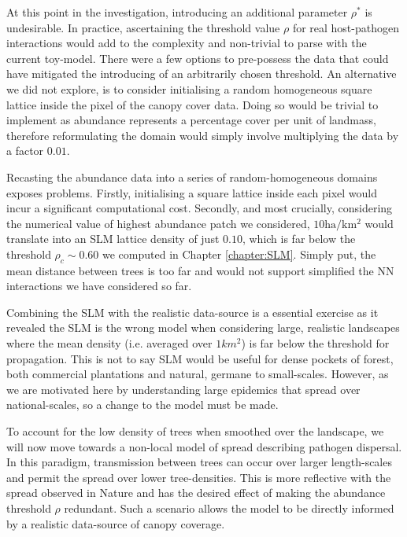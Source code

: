 At this point in the investigation, introducing an additional parameter $\rho^*$ is undesirable. %
In practice, ascertaining the threshold value $\rho$ for real host-pathogen interactions would add to the complexity and non-trivial to parse with the current toy-model. %
There were a few options to pre-possess the data that could have mitigated the introducing of an arbitrarily chosen threshold. %
An alternative we did not explore, is to consider initialising a random homogeneous square lattice inside the pixel of the canopy cover data. %
Doing so would be trivial to implement as abundance represents a percentage cover per unit of landmass, therefore reformulating the domain would simply involve multiplying the data by a factor $0.01$. %

Recasting the abundance data into a series of random-homogeneous domains exposes problems. %
Firstly, initialising a square lattice inside each pixel would incur a significant computational cost. %
Secondly, and most crucially, considering the numerical value of highest abundance patch we considered, $10\mathrm{ha/km^2}$ would translate into an SLM lattice density of just $0.10$, which  is far below the threshold $\rho_c \sim 0.60$ we computed in Chapter \ref{chapter:SLM}.%
Simply put, the mean distance between trees is too far and would not support simplified the NN interactions we have considered so far. 

Combining the SLM with the realistic data-source is a essential exercise as it revealed the SLM is the wrong model when considering large, realistic landscapes where the mean density (i.e. averaged over $1km^2$) is far below the threshold for propagation. %
This is not to say SLM would be useful for dense pockets of forest, both commercial plantations and natural, germane to small-scales. %
However, as we are motivated here by understanding large epidemics that spread over national-scales, so a change to the model must be made. 

To account for the low density of trees when smoothed over the landscape, we will now move towards a non-local model of spread describing pathogen dispersal. %
In this paradigm, transmission between trees can occur over larger length-scales and permit the spread over lower tree-densities. %
This is more reflective with the spread observed in Nature and has the desired effect of making the abundance threshold $\rho$ redundant. %
Such a scenario  allows the model to be directly informed by a realistic data-source of canopy coverage.
\newpage
